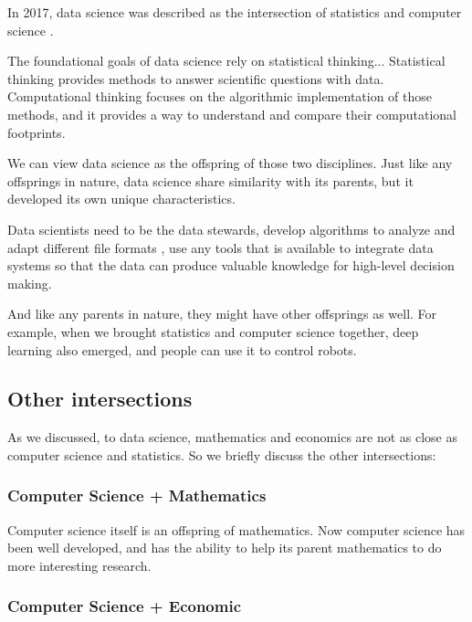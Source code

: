 In 2017, data science was described as the intersection of statistics and computer science \cite{blei_science_2017}.

\begin{displayquote}
The foundational goals of data science rely on statistical thinking...
Statistical thinking provides methods to answer scientific questions with data.
Computational thinking focuses on the algorithmic implementation of those methods, and it provides a way to understand and compare their computational footprints.
\end{displayquote}

We can view data science as the offspring of those two disciplines.
Just like any offsprings in nature, data science share similarity with its parents, but it developed its own unique characteristics.

Data scientists need to be the data stewards, develop algorithms to analyze and adapt different file formats \cite{mattmann_vision_2013}, use any tools that is available to integrate data systems so that the data can produce valuable knowledge for high-level decision making.

And like any parents in nature, they might have other offsprings as well. 
For example, when we brought statistics and computer science together, deep learning also emerged, and people can use it to control robots.

\subsection*{Other intersections}

As we discussed, to data science, mathematics and economics are not as close as computer science and statistics.
So we briefly discuss the other intersections:

\subsubsection*{Computer Science + Mathematics}

Computer science itself is an offspring of mathematics.
Now computer science has been well developed, and has the ability to help its parent mathematics to do more interesting research.

\subsubsection*{Computer Science + Economic}

